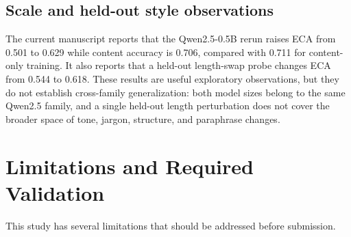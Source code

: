 \documentclass[letterpaper]{article} %
\begin{document}
\subsection{Scale and held-out style observations}

The current manuscript reports that the Qwen2.5-0.5B rerun raises ECA from 0.501 to 0.629 while content accuracy is 0.706, compared with 0.711 for content-only training. It also reports that a held-out length-swap probe changes ECA from 0.544 to 0.618. These results are useful exploratory observations, but they do not establish cross-family generalization: both model sizes belong to the same Qwen2.5 family, and a single held-out length perturbation does not cover the broader space of tone, jargon, structure, and paraphrase changes.

\section{Limitations and Required Validation}

This study has several limitations that should be addressed before submission.
\end{document}
